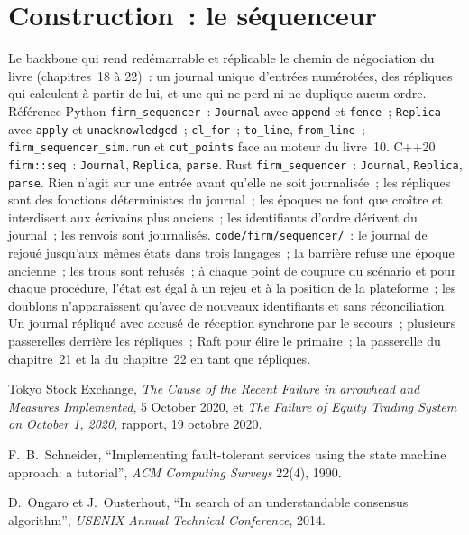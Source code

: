 \section{Construction~: le séquenceur}\label{bld:ll:resilience:sequencer}

\begin{build}
 Le backbone qui rend redémarrable et réplicable le chemin de négociation du livre (chapitres~18 à 22)~: un
journal unique d'entrées numérotées, des répliques qui calculent à partir de lui, et une  qui ne perd ni ne duplique aucun ordre.
 Référence Python \texttt{firm\_sequencer}~: \texttt{Journal} avec \texttt{append} et \texttt{fence}~;
\texttt{Replica} avec \texttt{apply} et \texttt{unacknowledged}~; \texttt{cl\_for}~; \texttt{to\_line}, \texttt{from\_line}~;
\texttt{firm\_sequencer\_sim.run} et \texttt{cut\_points} face au moteur du livre~10. C++20 \texttt{firm::seq}~:
\texttt{Journal}, \texttt{Replica}, \texttt{parse}. Rust \texttt{firm\_sequencer}~: \texttt{Journal}, \texttt{Replica},
\texttt{parse}.
 Rien n'agit sur une entrée avant qu'elle ne soit journalisée~; les répliques sont des fonctions déterministes du journal~; les époques
ne font que croître et interdisent aux écrivains plus anciens~; les identifiants d'ordre dérivent du journal~; les renvois sont journalisés.
 \texttt{code/firm/sequencer/}~: le journal de  rejoué jusqu'aux mêmes états dans trois langages~;
la barrière refuse une époque ancienne~; les trous sont refusés~; à chaque point de coupure du scénario et pour chaque procédure, l'état est égal à un rejeu
et à la position de la plateforme~; les doublons n'apparaissent qu'avec de nouveaux identifiants et sans réconciliation.
 Un journal répliqué avec accusé de réception synchrone par le secours~; plusieurs passerelles derrière les répliques~;
Raft pour élire le primaire~; la passerelle du chapitre~21 et la  du chapitre~22 en tant que répliques.
\end{build}

\begin{omsources}
\item Tokyo Stock Exchange, \emph{The Cause of the Recent Failure in arrowhead and Measures Implemented}, 5 October 2020, et
\emph{The Failure of Equity Trading System on October 1, 2020}, rapport, 19 octobre 2020.
\item F.~B.~Schneider, ``Implementing fault-tolerant services using the state machine approach: a tutorial'', \emph{ACM
Computing Surveys} 22(4), 1990.
\item D.~Ongaro et J.~Ousterhout, ``In search of an understandable consensus algorithm'', \emph{USENIX Annual Technical
Conference}, 2014.
\end{omsources}

